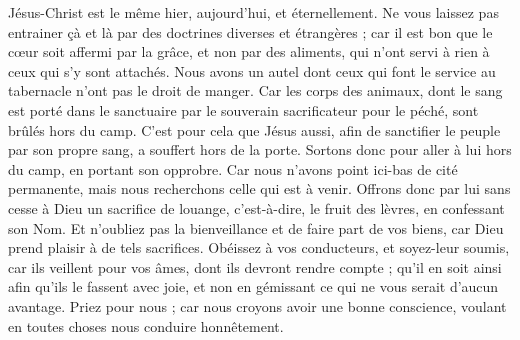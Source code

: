 \begin{multicols}{2}
Jésus-Christ est le même hier, aujourd'hui, et éternellement.
Ne vous laissez pas entrainer çà et là par des doctrines diverses et étrangères ; car il est bon que le cœur soit affermi par la grâce, et non par des aliments, qui n'ont servi à rien à ceux qui s'y sont attachés.
Nous avons un autel dont ceux qui font le service au tabernacle n'ont pas le droit de manger.
Car les corps des animaux, dont le sang est porté dans le sanctuaire par le souverain sacrificateur pour le péché, sont brûlés hors du camp.
C'est pour cela que Jésus aussi, afin de sanctifier le peuple par son propre sang, a souffert hors de la porte.
Sortons donc pour aller à lui hors du camp, en portant son opprobre.
Car nous n'avons point ici-bas de cité permanente, mais nous recherchons celle qui est à venir.
Offrons donc par lui sans cesse à Dieu un sacrifice de louange, c'est-à-dire, le fruit des lèvres, en confessant son Nom.
Et n'oubliez pas la bienveillance et de faire part de vos biens, car Dieu prend plaisir à de tels sacrifices.
Obéissez à vos conducteurs, et soyez-leur soumis, car ils veillent pour vos âmes, dont ils devront rendre compte ; qu’il en soit ainsi afin qu’ils le fassent avec joie, et non en gémissant ce qui ne vous serait d’aucun avantage.
Priez pour nous ; car nous croyons avoir une bonne conscience, voulant en toutes choses nous conduire honnêtement.

\end{multicols}
